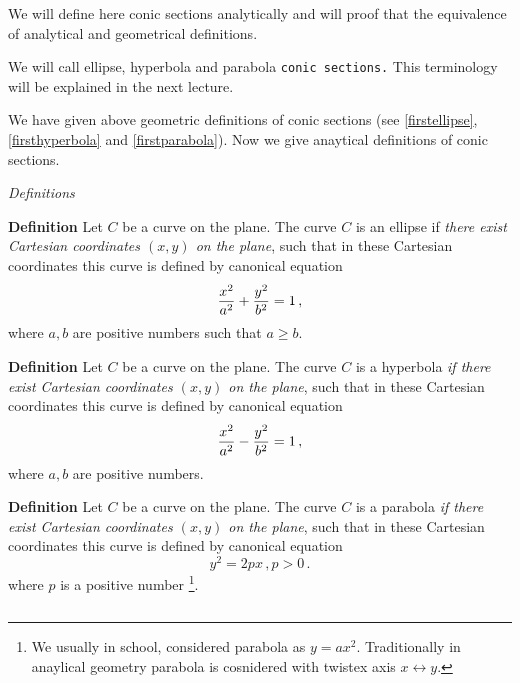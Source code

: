 \documentclass[12pt]{article}
\numberwithin{equation}{section}
\begin{document}
We will define here conic sections analytically and will proof
that the equivalence of analytical and geometrical definitions.

    We will call ellipse, hyperbola and parabola
  {\tt conic sections.}
This terminology will be explained in the next lecture.

  We have given above geometric definitions of 
  conic sections  (see \eqref{firstellipse}, \eqref{firsthyperbola} 
and \eqref{firstparabola}). Now we give
anaytical definitions of conic sections.

\m

\centerline {\it Definitions}

\m

{\bf Definition}  
Let $C$ be a curve on the plane. 
The  curve $C$ is an ellipse if {\it there exist
Cartesian coordinates $(x,y)$ on the plane},
such that in these Cartesian coordinates
this curve is defined by canonical  equation
     \begin{equation}\label{analytell}
   {x^2\over a^2}+{y^2\over b^2}=1\,,
     \end{equation}
where $a,b$ are positive numbers such that  $a\geq b$.

\m

{\bf Definition}  
Let $C$ be a curve on the plane. 
The  curve $C$ is a hyperbola  {\it if there exist
Cartesian coordinates $(x,y)$ on the plane},
such that in these Cartesian coordinates
this curve is defined by canonical equation
     \begin{equation}\label{analythyp}
   {x^2\over a^2}-{y^2\over b^2}=1\,,
     \end{equation}
where $a,b$ are positive numbers.


\m


\m

{\bf Definition}  
Let $C$ be a curve on the plane. 
The  curve $C$ is a parabola  {\it if there exist
Cartesian coordinates $(x,y)$ on the plane},
such that in these Cartesian coordinates
this curve is defined by canonical equation
     \begin{equation}\label{analytparabola}
   y^2=2px\,,  p>0\,.
     \end{equation}
where $p$ is a  positive number
\footnote{We usually in school, considered parabola as
$y=ax^2$. Traditionally in anaylical geometry parabola is
cosnidered with twistex axis $x\leftrightarrow y$.}.

$$ $$
\end{document}
